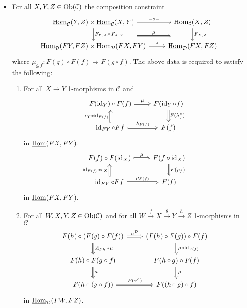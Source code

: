 \begin{defi}
\begin{itemize}
		\item 
		For all $ X , Y , Z \in \operatorname{Ob} ( \mathcal{ C } ) $ the composition constraint
		\[
		\begin{tikzcd}
			\underline{\Hom}_{\mathcal{ C } } ( Y , Z ) \times 
			\underline{ \Hom }_{ \mathcal{ C } } ( X , Y )
			\ar[r, " - \circ - " ]
			\ar[r, shift right=2em, Rightarrow, " \mu "]
			\ar[d, " F_{Y,Z} \times F_{X , Y} "]
			&
			\Hom_{ \mathcal{ C } } ( X , Z )
			\ar[d, " F_{X,Z}"]
			\\
			\underline{\Hom}_{\mathcal{ D } }( F Y , F Z ) \times 
			\Hom_{ \mathcal{ D } } ( F X , F Y )
			\ar[r, " - \circ - "]
			&
			\underline{\Hom}_{ \mathcal{ D } } ( F X , F Z )
		\end{tikzcd}
		\] 
		where $ \mu_{ g , f } \colon F ( g ) \circ F ( f ) \Rightarrow F ( g \circ f ) $.
		The above data is required to satisfy the following:
		\begin{enumerate}[label=(\alph*)]
			\item 
				For all $ X \to Y $ 1-morphisms in $ \mathcal{ C } $ and 
				\[
				\begin{tikzcd}
					F ( \id_Y ) \circ F ( f ) 
					\ar[r, Rightarrow, "\mu"]
					&
					F ( \id_Y \circ f ) 
					\ar[d, Rightarrow, " F ( \lambda^e_f)"]
					\\
					\id_{FY} \circ Ff
					\ar[u, Rightarrow, "\epsilon_Y * \id_{ F ( f ) }" ]
					\ar[r , Rightarrow , "\lambda_{F ( f ) }"]
					&
					F ( f ) 
				\end{tikzcd}	
				\]
				in $ \underline{\operatorname{Hom}}( FX, FY ).$
				\[
				\begin{tikzcd}
					F ( f ) \circ F ( \id_X ) 
					\ar[r, Rightarrow, "\mu"]
					&
					F ( f \circ \id_X ) 
					\ar[d, Rightarrow, " F ( \rho _f )"]
					\\
					\id_{FY} \circ Ff
					\ar[u, Rightarrow, " \id_{ F ( f ) } * \epsilon_X " ]
					\ar[r , Rightarrow , "\rho_{ F ( f ) }"]
					&
					F ( f ) 
				\end{tikzcd}	
				\]
				in $\underline{\operatorname{Hom}} ( FX , FY )$.
				
				\item 
				For all $ W , X , Y , Z \in \operatorname{Ob} ( \mathcal{ C } )$ and for all $ W \xrightarrow{ f } X \xrightarrow{ g } Y \xrightarrow{ h } Z$ 1-morphisms in $\mathcal{ C }$
				\[
				\begin{tikzcd}
					F ( h ) \circ ( F ( g ) \circ F ( f ) )
					\ar[r, Rightarrow, "\alpha^{ \mathcal{ D } }"]
					\ar[d, Rightarrow, " \id_{Fh} * \mu "]
					&
					( F ( h ) \circ F ( g ) ) \circ F ( f )
					\ar[d, Rightarrow, " \mu * \id_{ F ( f ) } "]
					\\
					F ( h ) \circ F ( g \circ f )
					\ar[d , Rightarrow, "\mu "]
					&
					F ( h \circ g ) \circ F ( f )
					\ar[d, Rightarrow, "\mu"]
					\\
					F ( h \circ ( g \circ f ) )
					\ar[r, Rightarrow, " F ( \alpha^e ) "]
					&
					F ( ( h \circ g ) \circ f )
				\end{tikzcd}
				\]
				in $ \underline{ \operatorname{Hom} }_{ \mathcal{ D } } ( FW , FZ )$.
 		\end{enumerate}
	\end{itemize}
\end{defi}

